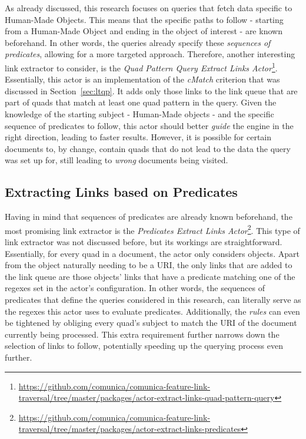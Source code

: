 As already discussed, this research focuses on queries that fetch data specific to Human-Made Objects. This means that the specific paths to follow - starting from a Human-Made Object and ending in the object of interest - are known beforehand. In other words, the queries already specify these \textit{sequences of predicates}, allowing for a more targeted approach. Therefore, another interesting link extractor to consider, is the \textit{Quad Pattern Query Extract Links Actor}\footnote{\url{https://github.com/comunica/comunica-feature-link-traversal/tree/master/packages/actor-extract-links-quad-pattern-query}}. Essentially, this actor is an implementation of the \textit{cMatch} criterion that was discussed in Section~\ref{sec:ltqp}. It adds only those links to the link queue that are part of quads that match at least one quad pattern in the query. Given the knowledge of the starting subject - Human-Made objects - and the specific sequence of predicates to follow, this actor should better \textit{guide} the engine in the right direction, leading to faster results. However, it is possible for certain documents to, by change, contain quads that do not lead to the data the query was set up for, still leading to \textit{wrong} documents being visited.

\subsection{Extracting Links based on Predicates}

Having in mind that sequences of predicates are already known beforehand, the most promising link extractor is the \textit{Predicates Extract Links Actor}\footnote{\url{https://github.com/comunica/comunica-feature-link-traversal/tree/master/packages/actor-extract-links-predicates}}. This type of link extractor was not discussed before, but its workings are straightforward. Essentially, for every quad in a document, the actor only considers objects. Apart from the object naturally needing to be a URI, the only links that are added to the link queue are those objects' links that have a predicate matching one of the regexes set in the actor's configuration. In other words, the sequences of predicates that define the queries considered in this research, can literally serve as the regexes this actor uses to evaluate predicates. Additionally, the \textit{rules} can even be tightened by obliging every quad's subject to match the URI of the document currently being processed. This extra requirement further narrows down the selection of links to follow, potentially speeding up the querying process even further.

